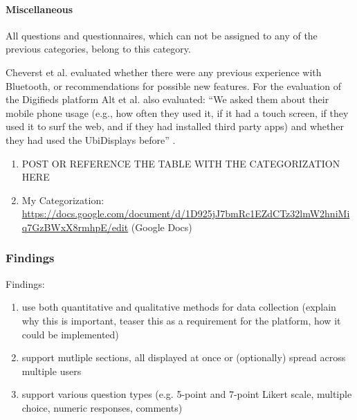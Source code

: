 	\paragraph{Miscellaneous}

		All questions and questionnaires, which can not be assigned to any of the previous categories, belong to this category. 

		Cheverst et al. \cite{cheverst2005hermes} evaluated whether there were any previous experience with Bluetooth, or recommendations for possible new features.
		For the evaluation of the Digifieds platform Alt et al. also evaluated: ``We asked them about their mobile phone usage (e.g., how often they used it, if it had a touch screen, if they used it to surf the web, and if they had installed third party apps) and whether they had used the UbiDisplays before'' \cite{alt2011digifieds}.








	\label{table:standardized-questionnaires}


	\begin{enumerate}
		\item POST OR REFERENCE THE TABLE WITH THE CATEGORIZATION HERE
		\item My Categorization: \url{https://docs.google.com/document/d/1D925jJ7bmRc1EZdCTz32lmW2hniMiq7GzBWxX8rmhpE/edit} (Google Docs)
	\end{enumerate}






\subsubsection{Findings}
\label{sec:questionnaires-findings}



	Findings: 
	\begin{enumerate}
	\item use both quantitative and qualitative methods for data collection (explain why this is important, teaser this as a requirement for the platform, how it could be implemented)
	\item support mutliple sections, all displayed at once or (optionally) spread across multiple users
	\item support various question types (e.g. 5-point and 7-point Likert scale, multiple choice, numeric responses, comments)
	\end{enumerate}



